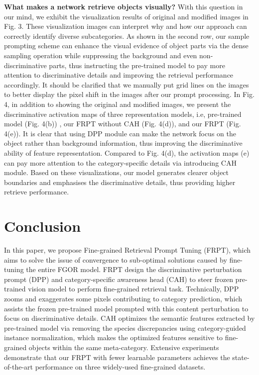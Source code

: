 \documentclass[letterpaper]{article} %
\begin{document}
\textbf{What makes a network retrieve objects visually?} With this question in our mind, we exhibit the visualization results of original and modified images in Fig. 3. These visualization images can interpret why and how our approach can correctly identify diverse subcategories. As shown in the second row, our sample prompting scheme can enhance the visual evidence of object parts via the dense sampling operation while suppressing the background and even non-discriminative parts, thus instructing the pre-trained model to pay more attention to discriminative details and improving the retrieval performance accordingly.
It should be clarified that we manually put grid lines on the images to better display the pixel shift in the images after our prompt processing. In Fig. 4, in addition to showing the original and modified images, we present the discriminative activation maps of three representation models, i.e, pre-trained model (Fig. 4(b)) , our FRPT without CAH (Fig. 4(d)), and our FRPT (Fig. 4(e)). It is clear that using DPP module can make the network focus on the object rather than background information, thus improving the discriminative ability of feature representation. Compared to Fig. 4(d), the activation maps (e) can pay more attention to the category-specific details via introducing CAH module. Based on these visualizations, our model generates clearer object boundaries and emphasises the discriminative details, thus providing higher retrieve performance.





\section{Conclusion}
In this paper, we propose Fine-grained Retrieval Prompt Tuning (FRPT), which aims to solve the issue of convergence to sub-optimal solutions caused by fine-tuning the entire FGOR model. FRPT design the discriminative perturbation prompt (DPP) and category-specific awareness head (CAH) to steer frozen pre-trained vision model to perform fine-grained retrieval task.
Technically, DPP zooms and exaggerates some pixels contributing to category prediction, which assists the frozen pre-trained model prompted with this content perturbation to focus on discriminative details.
CAH optimizes the semantic features extracted by pre-trained model via removing the species discrepancies using category-guided instance normalization,  which makes the optimized features sensitive to fine-grained objects within the same meta-category.
Extensive experiments demonstrate that our FRPT with fewer learnable parameters achieves the state-of-the-art performance on three widely-used fine-grained datasets.
\end{document}
